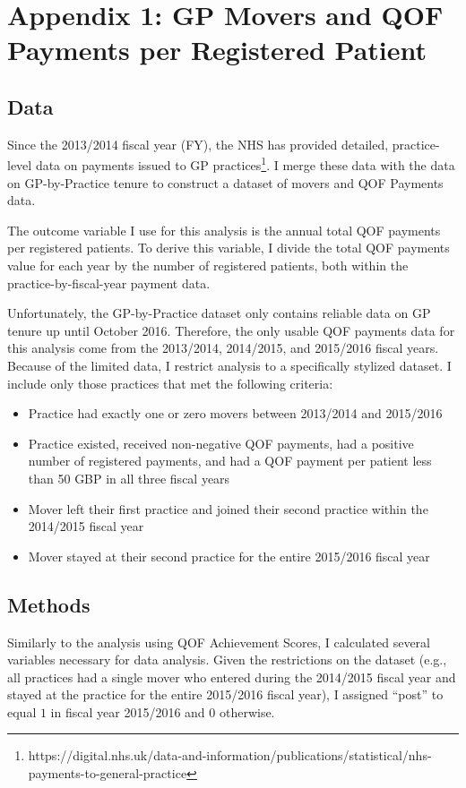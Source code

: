 \documentclass[11pt]{article}
\begin{document}
\section{Appendix 1: GP Movers and QOF Payments per Registered Patient}

\subsection{Data}
Since the 2013/2014 fiscal year (FY), the NHS has provided detailed, practice-level data on payments issued to GP practices\footnote{https://digital.nhs.uk/data-and-information/publications/statistical/nhs-payments-to-general-practice}. I merge these data with the data on GP-by-Practice tenure to construct a dataset of movers and QOF Payments data.

The outcome variable I use for this analysis is the annual total QOF payments per registered patients. To derive this variable, I divide the total QOF payments value for each year by the number of registered patients, both within the practice-by-fiscal-year payment data.

Unfortunately, the GP-by-Practice dataset only contains reliable data on GP tenure up until October 2016. Therefore, the only usable QOF payments data for this analysis come from the 2013/2014, 2014/2015, and 2015/2016 fiscal years. Because of the limited data, I restrict analysis to a specifically stylized dataset. I include only those practices that met the following criteria:

\begin{itemize}
  \item Practice had exactly one or zero movers between 2013/2014 and 2015/2016
  \item Practice existed, received non-negative QOF payments, had a positive number of registered payments, and had a QOF payment per patient less than 50 GBP in all three fiscal years
  \item Mover left their first practice and joined their second practice within the 2014/2015 fiscal year
  \item Mover stayed at their second practice for the entire 2015/2016 fiscal year
\end{itemize}

\subsection{Methods}
Similarly to the analysis using QOF Achievement Scores, I calculated several variables necessary for data analysis. Given the restrictions on the dataset (e.g., all practices had a single mover who entered during the 2014/2015 fiscal year and stayed at the practice for the entire 2015/2016 fiscal year), I assigned ``post'' to equal $1$ in fiscal year 2015/2016 and $0$ otherwise.
\end{document}
